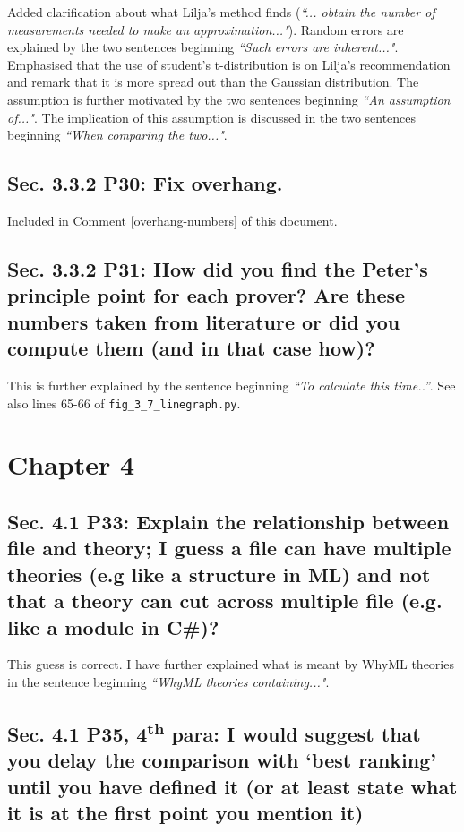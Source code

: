 \documentclass[]{article}
\newcommand{\ts}{\textsuperscript}
\begin{document}
Added clarification about what Lilja's method finds (\emph{``... obtain the number of measurements needed to make an approximation..."}). 
Random errors are explained by the two sentences beginning \emph{``Such errors are inherent..."}.
Emphasised that the use of student's t-distribution is on Lilja's recommendation and remark that it is more spread out than the Gaussian distribution. 
The assumption is further motivated by the two sentences beginning \emph{``An assumption of..."}.
The implication of this assumption is discussed in the two sentences beginning \emph{``When comparing the two..."}.

\subsection{Sec. 3.3.2 P30: Fix overhang.}

Included in Comment \ref{overhang-numbers} of this document.

\subsection{Sec. 3.3.2 P31: How did you find the Peter's principle point for each prover? Are these numbers taken from literature or did you compute them (and in that case how)?}

This is further explained by the sentence beginning \emph{``To calculate this time..''}. See also lines 65-66 of \texttt{fig\_3\_7\_linegraph.py}.

\section{Chapter 4}

\subsection{Sec. 4.1 P33: Explain the relationship between file and theory; I guess a file can have multiple theories (e.g like a structure in ML) and not that a theory can cut across multiple file (e.g. like a module in C\#)?}

This guess is correct. I have further explained what is meant by WhyML theories in the sentence beginning \emph{``WhyML theories containing..."}.

\subsection{Sec. 4.1 P35, 4\ts{th} para: I would suggest that you delay the comparison with `best ranking' until you have defined it (or at least state what it is at the first point you mention it)}
\end{document}
